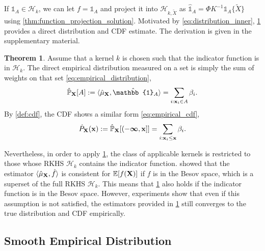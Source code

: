 \documentclass[twoside]{article} \usepackage{aistats2017}
\theoremstyle{definition}
\theoremstyle{theorem}
\newtheorem{theorem}{Theorem}[section]
\newcommand{\rv}[1]{{#1}}
\newcommand{\ds}[1]{\tilde{#1}}
\newcommand{\inner}[2]{{\langle #1, #2 \rangle}}
\begin{document}
		If $\mathbb{1}_{A} \in \mathcal{H}_{k}$, we can let $f = \mathbb{1}_{A}$ and project it into $\mathcal{H}_{k, \ds{X}}$ as $\hat{\mathbb{1}}_{A} = \Phi K^{-1} \mathbb{1}_{A}\{\ds{X}\}$ using \cref{thm:function_projection_solution}. Motivated by \eqref{eq:distribution_inner}, \cref{thm:empirical_distribution_and_cdf} provides a direct distribution and CDF estimate. The derivation is given in the supplementary material.
		\begin{theorem} \label{thm:empirical_distribution_and_cdf}
			Assume that a kernel $k$ is chosen such that the indicator function is in $\mathcal{H}_{k}$. The direct empirical distribution measured on a set is simply the sum of weights on that set \eqref{eq:empirical_distribution},
			\begin{equation}
				\hat{\mathbb{P}}_{\bvec{\rv{X}}}[A] := \inner{\hat{\mu}_{\bvec{\rv{X}}}}{ \hat{\mathbb{1}}_{A}} = \sum_{i : \bvec{x}_{i} \in A} \beta_{i}.
			\label{eq:empirical_distribution}
			\end{equation}
			By \cref{def:cdf}, the CDF shows a similar form \eqref{eq:empirical_cdf},
			\begin{equation}
				\hat{P}_{\bvec{\rv{X}}}(\bvec{x}) := \hat{\mathbb{P}}_{\bvec{\rv{X}}}[(-\bm{\infty}, \bvec{x}]] = \sum_{i : \bvec{x}_{i} \leq \bvec{x}} \beta_{i}.
			\label{eq:empirical_cdf}
			\end{equation}
		\end{theorem}
		Nevertheless, in order to apply \cref{thm:empirical_distribution_and_cdf}, the class of applicable kernels is restricted to those whose RKHS $\mathcal{H}_{k}$ contains the indicator function. \cite{kanagawa2014recovering} showed that the estimator $\langle \hat{\mu}_{\bvec{\rv{X}}}, \hat{f} \rangle$ is consistent for $\mathbb{E}[f(\bvec{\rv{X}})]$ if $f$ is in the Besov space, which is a superset of the full RKHS $\mathcal{H}_{k}$. This means that \cref{thm:empirical_distribution_and_cdf} also holds if the indicator function is in the Besov space. However, experiments show that even if this assumption is not satisfied, the estimators provided in \cref{thm:empirical_distribution_and_cdf} still converges to the true distribution and CDF empirically.

	\subsection{Smooth Empirical Distribution}
	\label{sec:direct_quantile_regression:smooth_empirical_distribution}
\end{document}
